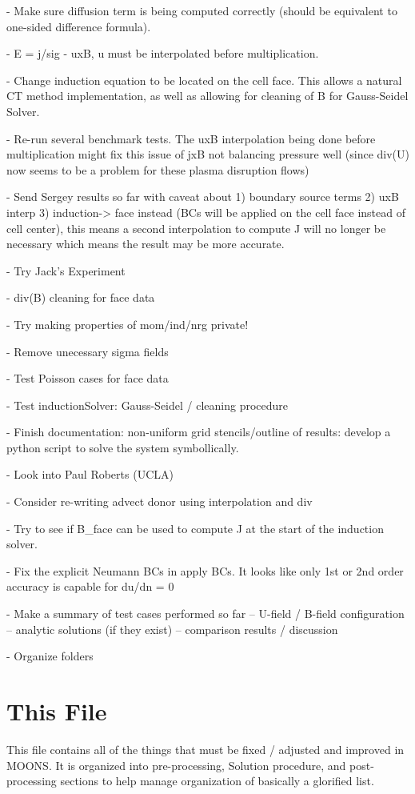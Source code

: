 \documentclass[11pt]{article}
\begin{document}
- Make sure diffusion term is being computed correctly (should be equivalent to one-sided difference formula). 

- E = j/sig - uxB, u must be interpolated before multiplication.

- Change induction equation to be located on the cell face. This allows a natural CT method implementation, as well as allowing for cleaning of B for Gauss-Seidel Solver.

- Re-run several benchmark tests. The uxB interpolation being done before multiplication might fix this issue of jxB not balancing pressure well (since div(U) now seems to be a problem for these plasma disruption flows)

- Send Sergey results so far with caveat about 1) boundary source terms 2) uxB interp 3) induction-> face instead (BCs will be applied on the cell face instead of cell center), this means a second interpolation to compute J will no longer be necessary which means the result may be more accurate.

- Try Jack's Experiment

- div(B) cleaning for face data

- Try making properties of mom/ind/nrg private!

- Remove unecessary sigma fields

- Test Poisson cases for face data

- Test inductionSolver: Gauss-Seidel / cleaning procedure

- Finish documentation: non-uniform grid stencils/outline of results: develop a python script to solve the system symbollically.

- Look into Paul Roberts (UCLA)

- Consider re-writing advect donor using interpolation and div

- Try to see if B\_face can be used to compute J at the start of the induction solver.

- Fix the explicit Neumann BCs in apply BCs. It looks like only 1st or 2nd order accuracy is capable for du/dn = 0

- Make a summary of test cases performed so far
-- U-field / B-field configuration 
-- analytic solutions (if they exist)
-- comparison results / discussion

- Organize folders

\section{This File}
This file contains all of the things that must be fixed / adjusted and improved in MOONS. It is organized into pre-processing, Solution procedure, and post-processing sections to help manage organization of basically a glorified list.
\end{document}
